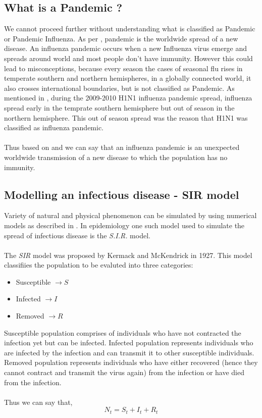 \documentclass[12pt, twosided]{report}  %
\begin{document}
\subsection*{What is a Pandemic ?}
We cannot proceed further without understanding what is classified as Pandemic or Pandemic Influenza. As per \cite{WHO_2010_1}, pandemic is the worldwide spread of a new disease. An influenza pandemic occurs when a new Influenza virus emerge and spreads around world and most people don't have immunity. However this could lead to misconceptions, because every season the cases of seasonal flu rises in  temperate southern and northern hemispheres, in a globally connected world, it also crosses international boundaries, but is not classified as Pandemic. As mentioned in \cite{WHO_2011}, during the 2009-2010 H1N1 influenza pandemic spread, influenza spread early in the temprate southern hemisphere but out of season in the northern hemisphere. This out of season spread was the reason that H1N1 was classified as influenza pandemic.
\\
\\
Thus based on \cite{WHO_2010_1} and \cite{WHO_2011} we can say that an influenza pandemic is an unexpected worldwide transmission of a new disease to which the population has no immunity. 

\subsection*{Modelling an infectious disease - SIR model}
Variety of natural and physical phenomenon can be simulated by using numerical models as described in \cite{scharnhorst2012models}. In epidemiology one such model used to simulate the spread of infectious disease is the \textit{S.I.R.} model.
\\
\\
The \textit{SIR} model was proposed by Kermack and McKendrick \cite{kermack1927contribution} in 1927. This model classifiies the population to be evaluted into three categories:
\begin{itemize}
	\item Susceptible $\rightarrow S $
	\item Infected $\rightarrow I $
	\item Removed $\rightarrow R $
\end{itemize}
Susceptible population comprises of individuals who have not contracted the infection yet but can be infected. Infected population represents individuals who are infected by the infection and can transmit it to other susceptible individuals. Removed population represents individuals who have either recovered (hence they cannot contract and transmit the virus again) from the infection or have died from the infection.
\\
\\
Thus we can say that,
$$ N_t = S_t + I_t + R_t $$
\end{document}
